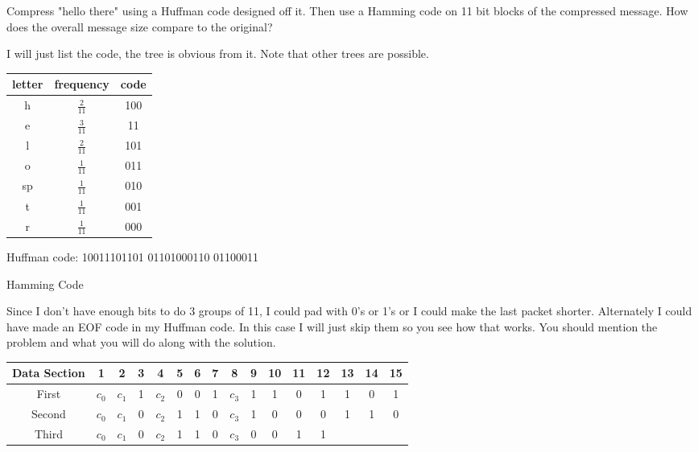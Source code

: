 Compress "hello there" using a Huffman code designed off it.  Then use a Hamming code on 11 bit blocks of the compressed message.  How does the overall message size compare to the original?
    {\color{ans}
    I will just list the code, the tree is obvious from it.  Note that other trees are possible.

    \vspace{.1in}
    \begin{tabular}{|c|c|c|} \hline
      letter & frequency      & code \\ \hline
      h      & $\frac{2}{11}$ & 100 \\
      e      & $\frac{3}{11}$ & 11 \\
      l      & $\frac{2}{11}$ & 101 \\
      o      & $\frac{1}{11}$ & 011 \\
      sp     & $\frac{1}{11}$ & 010 \\
      t      & $\frac{1}{11}$ & 001 \\
      r      & $\frac{1}{11}$ & 000 \\ \hline
    \end{tabular}
    \vspace{.1in}

    Huffman code: 10011101101 01101000110 01100011

    \vspace{.2in}

    Hamming Code

    Since I don't have enough bits to do 3 groups of 11, I could pad with 0's or 1's or I could make the last packet shorter.  Alternately I could have made an EOF code in my Huffman code.  In this case I will just skip them so you see how that works.  You should mention the problem and what you will do along with the solution.

    \vspace{.1in}
    \begin{tabular}{|c|c|c|c|c|c|c|c|c|c|c|c|c|c|c|c|}
      \hline
      Data Section & 1 & 2 & 3 & 4 & 5 & 6 & 7 & 8 & 9 & 10 & 11 & 12 & 13 & 14 & 15 \\ \hline
      First  & $c_0$ & $c_1$ & 1 & $c_2$ & 0 & 0 & 1 & $c_3$ & 1 & 1 & 0 & 1 & 1 & 0 & 1 \\ \hline
      Second & $c_0$ & $c_1$ & 0 & $c_2$ & 1 & 1 & 0 & $c_3$ & 1 & 0 & 0 & 0 & 1 & 1 & 0 \\ \hline
      Third  & $c_0$ & $c_1$ & 0 & $c_2$ & 1 & 1 & 0 & $c_3$ & 0 & 0 & 1 & 1 &  &  &  \\ \hline
    \end{tabular}
    \vspace{.1in}

}
